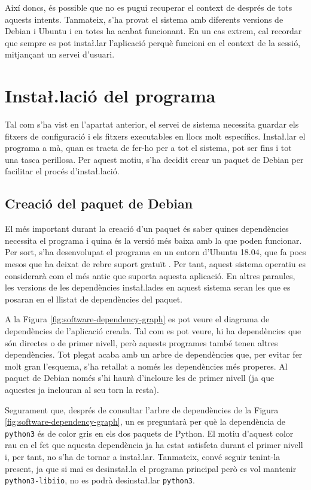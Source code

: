 Així doncs, és possible que no es pugui recuperar el context de 
després de tots aquests intents. Tanmateix, s'ha provat el
sistema amb diferents versions de Debian i Ubuntu i en totes ha acabat funcionant.
En un cas extrem, cal recordar que sempre es pot insta\l.lar l'aplicació perquè
funcioni en el context de la sessió, mitjançant un servei d'usuari.

\section{Insta\l.lació del programa}

Tal com s'ha vist en l'apartat anterior, el servei de sistema necessita guardar
els fitxers de configuració i els fitxers executables en llocs molt específics.
Insta\l.lar el programa a mà, quan es tracta de fer-ho per a tot el sistema,
pot ser fins i tot una tasca perillosa. Per aquest motiu, s'ha decidit crear un
paquet de Debian per facilitar el procés d'insta\l.lació.

\subsection{Creació del paquet de Debian}

El més important durant la creació d'un paquet és saber quines dependències
necessita el programa i quina és la versió més baixa amb la que poden funcionar.
Per sort, s'ha desenvolupat el programa en un entorn d'Ubuntu 18.04, que fa
pocs mesos que ha deixat de rebre suport gratuït \cite{UbuntuSupport}. Per tant,
aquest sistema
operatiu es considerarà com el més antic que suporta aquesta aplicació. En altres
paraules, les versions de les dependències insta\l.lades en aquest sistema seran
les que es posaran en el llistat de dependències del paquet.

A la Figura \ref{fig:software-dependency-graph} es pot veure el diagrama de
dependències de l'aplicació creada. Tal com es pot veure, hi ha dependències que
són directes o de primer nivell, però aquests programes també tenen altres
dependències. Tot plegat acaba amb un arbre de dependències que, per evitar fer
molt gran l'esquema, s'ha retallat a només les dependències més properes. Al
paquet de Debian només s'hi haurà d'incloure les de primer nivell (ja que aquestes
ja inclouran al seu torn la resta).



Segurament que, després de consultar l'arbre de dependències de la Figura
\ref{fig:software-dependency-graph}, un es preguntarà per què la dependència
de \texttt{python3} és de color gris en els dos paquets de Python. El motiu
d'aquest color rau en el fet que aquesta dependència ja ha estat satisfeta durant
el primer nivell i, per tant, no s'ha de tornar a insta\l.lar. Tanmateix, convé
seguir tenint-la present, ja que si mai es desinsta\l.la el programa principal
però es vol mantenir \texttt{python3-libiio}, no es podrà desinsta\l.lar
\texttt{python3}.

